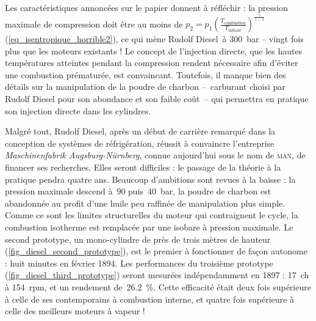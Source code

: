 	Les caractéristiques annoncées sur le papier donnent à réfléchir : la pression maximale de compression doit être au moins de $p_2 = p_1 \left( \frac{T_\text{combustion}}{T_\text{initiale}} \right)^{\frac{\gamma}{\gamma -1}}$ (\ref{eq_isentropique_horrible2}), ce qui mène Rudolf Diesel~à \SI{300}{\bar} -- vingt fois plus que les moteurs existants ! Le concept de l’injection directe, que les hautes températures atteintes pendant la compression rendent nécessaire afin d’éviter une combustion prématurée, est convaincant. Toutefois, il manque bien des détails sur la manipulation de la poudre de charbon --\ carburant choisi par Rudolf Diesel pour son abondance et son faible coût\ -- qui permettra en pratique son injection directe dans les cylindres.

	Malgré tout, Rudolf Diesel, après un début de carrière remarqué dans la conception de systèmes de réfrigération, réussit à convaincre l’entreprise \textit{Maschinenfabrik Augsburg-Nürnberg}, connue aujourd’hui sous le nom de \textsc{man}, de financer ses recherches. Elles seront difficiles : le passage de la théorie à la pratique pendra quatre ans. Beaucoup d’ambitions sont revues à la baisse : la pression maximale descend à~\num{90} puis~\SI{40}{\bar}, la poudre de charbon est abandonnée au profit d’une huile peu raffinée de manipulation plus simple. Comme ce sont les limites structurelles du moteur qui contraignent le cycle, la combustion isotherme est remplacée par une isobare à pression maximale. Le second prototype, un mono-cylindre de près de trois mètres de hauteur (\cref{fig_diesel_second_prototype}), est le premier à fonctionner de façon autonome : huit minutes en février 1894. Les performances du troisième prototype (\cref{fig_diesel_third_prototype})	seront mesurées indépendamment en 1897 : \SI{17}{ch} à \SI{154}{rpm}, et un rendement de~\SI{26,2}{\percent}. Cette efficacité était deux fois supérieure à celle de ses contemporains à combustion interne, et quatre fois supérieure à celle des meilleurs moteurs à vapeur !
